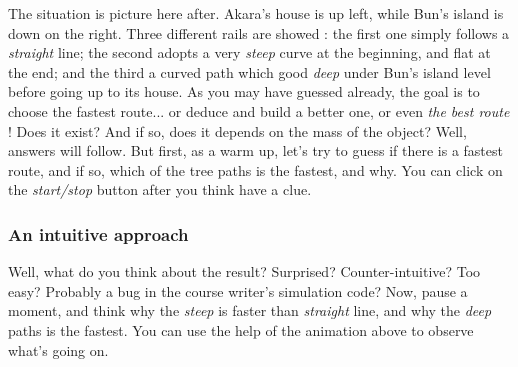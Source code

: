 \documentclass{article}
\begin{document}
The situation is picture here after. Akara's house is up left, while Bun's island is down on the right. Three different rails are showed : the first one simply follows a \textit{straight} line; the second adopts a very \textit{steep} curve at the beginning, and flat at the end; and the third a curved path which good \textit{deep} under Bun's island level before going up to its house. As you may have guessed already, the goal is to choose the fastest route... or deduce and build a better one, or even \textit{the best route} ! Does it exist? And if so, does it depends on the mass of the object? Well, answers will follow. But first, as a warm up, let's try to guess if there is a fastest route, and if so, which of the tree paths is the fastest, and why. You can click on the \textit{start/stop} button after you think have a clue.


%



\subsubsection*{An intuitive approach}

Well, what do you think about the result? Surprised? Counter-intuitive? Too easy? Probably a bug in the course writer's simulation code? Now, pause a moment, and think why the \textit{steep} is faster than \textit{straight} line, and why the \textit{deep} paths is the fastest. You can use the help of the animation above to observe what's going on.\\
\end{document}
